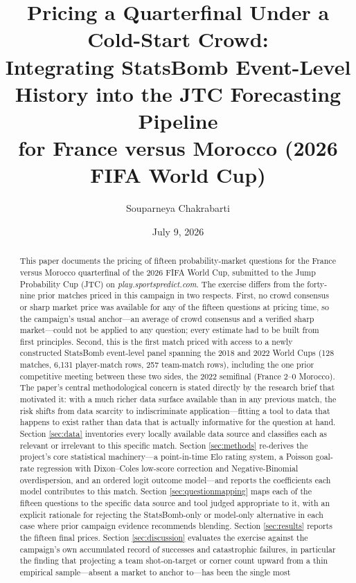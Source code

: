 \documentclass[11pt]{article}
\title{Pricing a Quarterfinal Under a Cold-Start Crowd: \\
Integrating StatsBomb Event-Level History into the JTC Forecasting Pipeline \\
for France versus Morocco (2026 FIFA World Cup)}
\author{Souparneya Chakrabarti}
\date{July 9, 2026}
\begin{document}
\maketitle

\begin{abstract}
This paper documents the pricing of fifteen probability-market questions for the France
versus Morocco quarterfinal of the 2026 FIFA World Cup, submitted to the Jump Probability
Cup (JTC) on \textit{play.sportspredict.com}. The exercise differs from the forty-nine
prior matches priced in this campaign in two respects. First, no crowd consensus or sharp
market price was available for any of the fifteen questions at pricing time, so the
campaign's usual anchor---an average of crowd consensus and a verified sharp market---could
not be applied to any question; every estimate had to be built from first principles.
Second, this is the first match priced with access to a newly constructed StatsBomb
event-level panel spanning the 2018 and 2022 World Cups (128 matches, 6{,}131
player-match rows, 257 team-match rows), including the one prior competitive meeting
between these two sides, the 2022 semifinal (France 2--0 Morocco). The paper's central
methodological concern is stated directly by the research brief that motivated it: with
a much richer data surface available than in any previous match, the risk shifts from
data scarcity to indiscriminate application---fitting a tool to data that happens to
exist rather than data that is actually informative for the question at hand. Section
\ref{sec:data} inventories every locally available data source and classifies each as
relevant or irrelevant to this specific match. Section \ref{sec:methods} re-derives the
project's core statistical machinery---a point-in-time Elo rating system, a Poisson
goal-rate regression with Dixon--Coles low-score correction and Negative-Binomial
overdispersion, and an ordered logit outcome model---and reports the coefficients each
model contributes to this match. Section \ref{sec:questionmapping} maps each of the
fifteen questions to the specific data source and tool judged appropriate to it, with an
explicit rationale for rejecting the StatsBomb-only or model-only alternative in each
case where prior campaign evidence recommends blending. Section \ref{sec:results}
reports the fifteen final prices. Section \ref{sec:discussion} evaluates the exercise
against the campaign's own accumulated record of successes and catastrophic failures,
in particular the finding that projecting a team shot-on-target or corner count upward
from a thin empirical sample---absent a market to anchor to---has been the single most

\end{abstract}
\end{document}
